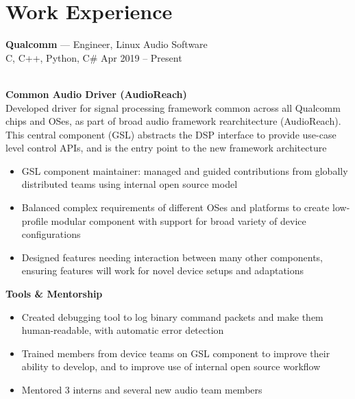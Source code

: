 \documentclass[letterpaper,10pt]{article}
\newcommand{\comment}[1]{}
\newcommand{\jobtitle}[4]{
    {\large \textbf{#1} --- #2\\}
    {\footnotesize#3 \hfill #4}
}
\begin{document}
\begin{minipage}[t]{0.6\textwidth} %


\section{Work Experience}
\medskip

\jobtitle{Qualcomm}{Engineer, Linux Audio Software}{C, C++, Python, C\#}{Apr 2019 -- Present}
\smallskip
\\
\textbf{Common Audio Driver (AudioReach)}
\\
Developed driver for signal processing framework common across all Qualcomm chips and OSes, as part of broad audio framework rearchitecture (AudioReach).
This central component (GSL) abstracts the DSP interface to provide use-case level control APIs, and is the entry point to the new framework architecture
\smallskip
\begin{itemize}
    \item {GSL component maintainer: managed and guided contributions from globally distributed teams using internal open source model}
    \item {Balanced complex requirements of different OSes and platforms to create low-profile modular component with support for broad variety of device configurations}
    \item {Designed features needing interaction between many other components, ensuring features will work for novel device setups and adaptations}
\comment{    \item {Built performant shared memory management with no memcpy and minimal mapping to support run-time application-level memory management for Android Codec 2.0} }
\comment{    \item {Created extensible error detection mechanism to recover from fatal scenarios without device restart} }
\end{itemize}

\smallskip
\textbf{Tools \& Mentorship}
\begin{itemize}
    \item {Created debugging tool to log binary command packets and make them human-readable, with automatic error detection}
    \item {Trained members from device teams on GSL component to improve their ability to develop, and to improve use of internal open source workflow}
    \item {Mentored 3 interns and several new audio team members}
    

\end{itemize}
\end{minipage}
\end{document}
